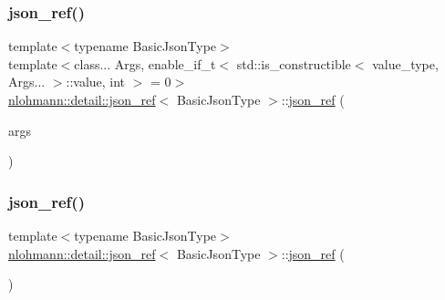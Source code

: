 \subsubsection{\texorpdfstring{json\_ref()}{json\_ref()}\hspace{0.1cm}{\footnotesize\ttfamily [4/6]}}
{\footnotesize\ttfamily template$<$typename Basic\+Json\+Type$>$ \\
template$<$class... Args, enable\+\_\+if\+\_\+t$<$ std\+::is\+\_\+constructible$<$ value\+\_\+type, Args... $>$\+::value, int $>$  = 0$>$ \\
\mbox{\hyperlink{classnlohmann_1_1detail_1_1json__ref}{nlohmann\+::detail\+::json\+\_\+ref}}$<$ Basic\+Json\+Type $>$\+::\mbox{\hyperlink{classnlohmann_1_1detail_1_1json__ref}{json\+\_\+ref}} (\begin{DoxyParamCaption}\item[{Args \&\&...}]{args }\end{DoxyParamCaption})\hspace{0.3cm}{\ttfamily [inline]}}

\mbox{\label{classnlohmann_1_1detail_1_1json__ref_a59221ddbd756ca24d289c787fab38dbc}} 
\subsubsection{\texorpdfstring{json\_ref()}{json\_ref()}\hspace{0.1cm}{\footnotesize\ttfamily [5/6]}}
{\footnotesize\ttfamily template$<$typename Basic\+Json\+Type$>$ \\
\mbox{\hyperlink{classnlohmann_1_1detail_1_1json__ref}{nlohmann\+::detail\+::json\+\_\+ref}}$<$ Basic\+Json\+Type $>$\+::\mbox{\hyperlink{classnlohmann_1_1detail_1_1json__ref}{json\+\_\+ref}} (\begin{DoxyParamCaption}\item[{\mbox{\hyperlink{classnlohmann_1_1detail_1_1json__ref}{json\+\_\+ref}}$<$ Basic\+Json\+Type $>$ \&\&}]{ }\end{DoxyParamCaption})\hspace{0.3cm}{\ttfamily [default]}}

\mbox{\label{classnlohmann_1_1detail_1_1json__ref_a4c68db46934e03588bbd73b00147c0dd}} 

